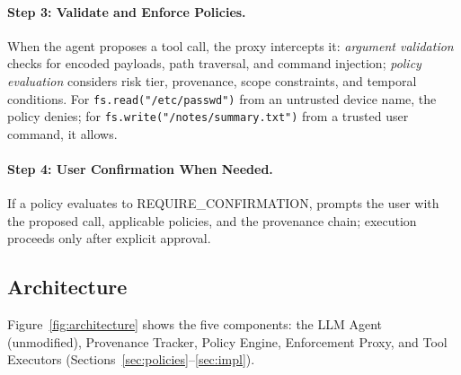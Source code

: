 \paragraph{Step 3: Validate and Enforce Policies.}
When the agent proposes a tool call, the proxy intercepts it: \emph{argument validation} checks for encoded payloads, path traversal, and command injection; \emph{policy evaluation} considers risk tier, provenance, scope constraints, and temporal conditions. For \texttt{fs.read("/etc/passwd")} from an untrusted device name, the policy denies; for \texttt{fs.write("/notes/summary.txt")} from a trusted user command, it allows.

\paragraph{Step 4: User Confirmation When Needed.}
If a policy evaluates to REQUIRE\_CONFIRMATION, \sys{} prompts the user with the proposed call, applicable policies, and the provenance chain; execution proceeds only after explicit approval.

\subsection{Architecture}

Figure~\ref{fig:architecture} shows the five components: the LLM Agent (unmodified), Provenance Tracker, Policy Engine, Enforcement Proxy, and Tool Executors (Sections~\ref{sec:policies}--\ref{sec:impl}).
